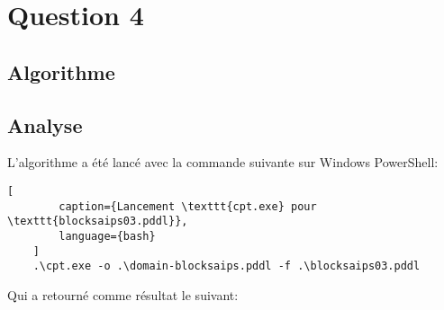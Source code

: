 \documentclass[../CSC_5RO16_TA_TP5.tex]{subfiles}
\begin{document}
\section{Question 4}
% 

\subsection{Algorithme}

\begin{scriptsize}\mycode
    
\end{scriptsize}

\subsection{Analyse}

\noindent L'algorithme a été lancé avec la commande suivante sur Windows PowerShell:

\begin{scriptsize}\mycode
	\begin{lstlisting}[
        caption={Lancement \texttt{cpt.exe} pour \texttt{blocksaips03.pddl}},
        language={bash}
    ]
    .\cpt.exe -o .\domain-blocksaips.pddl -f .\blocksaips03.pddl
    \end{lstlisting}
\end{scriptsize}

\noindent Qui a retourné comme résultat le suivant:
\end{document}

